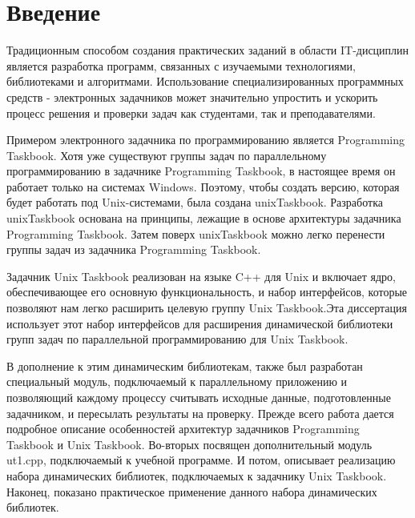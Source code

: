 \fixmargins
\makepreliminarypages
\oneandhalfspace
{}
\tableofcontents

\section{Введение}

Традиционным способом создания практических заданий в области IT-дисциплин 
является разработка программ, связанных с изучаемыми технологиями, библиотеками 
и алгоритмами. Использование специализированных программных средств - электронных задачников \cite{ref18} 
может значительно упростить и ускорить процесс решения и проверки задач как студентами, так и преподавателями.

Примером электронного задачника по программированию является Programming Taskbook. 
Хотя уже существуют группы задач по параллельному программированию в задачнике Programming 
Taskbook, в настоящее время он работает только на системах Windows.  
Поэтому, чтобы создать версию, которая будет работать под Unix-системами, была создана unixTaskbook\cite{ref1}.
Разработка unixTaskbook основана на принципы, лежащие в основе архитектуры задачника Programming Taskbook\cite{ref19}.
Затем поверх unixTaskbook можно легко перенести группы задач из задачника Programming Taskbook.


Задачник Unix Taskbook реализован на языке C++ для Unix и включает ядро, 
обеспечивающее его основную функциональность, и набор интерфейсов, которые 
позволяют нам легко расширить целевую группу Unix Taskbook.Эта диссертация 
использует этот набор интерфейсов для расширения динамической библиотеки групп 
задач по параллельной программированию для Unix Taskbook.

В дополнение к этим динамическим библиотекам, также был разработан специальный 
модуль, подключаемый к параллельному приложению и позволяющий каждому процессу 
считывать исходные данные, подготовленные задачником, и пересылать результаты 
на проверку. Прежде всего работа дается подробное описание особенностей архитектур 
задачников Programming Taskbook и Unix Taskbook. Во-вторых посвящен дополнительный
 модуль ut1.cpp, подключаемый к учебной программе. И потом, описывает реализацию 
 набора динамических библиотек, подключаемых к задачнику Unix Taskbook. Наконец, 
 показано практическое применение данного набора динамических библиотек.


